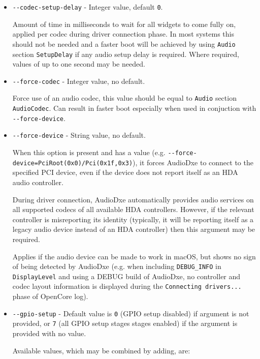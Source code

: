 \documentclass[]{article}
\providecommand{\tightlist}{%
  \setlength{\itemsep}{0pt}\setlength{\parskip}{0pt}}
\begin{document}
\begin{itemize}
  \tightlist
	\item \texttt{-{}-codec-setup-delay} - Integer value, default \texttt{0}. \medskip

  Amount of time in milliseconds to wait for all widgets to come fully on, applied per codec
  during driver connection phase. In most systems this should not be needed and a faster boot
  will be achieved by using \texttt{Audio} section \texttt{SetupDelay} if any audio setup delay
  is required. Where required, values of up to one second may be needed. \medskip

  \item \texttt{-{}-force-codec} - Integer value, no default. \medskip

  Force use of an audio codec, this value should be equal to \texttt{Audio} section \texttt{AudioCodec}.
  Can result in faster boot especially when used in conjuction with \texttt{-{}-force-device}. \medskip

	\item \texttt{-{}-force-device} - String value, no default. \medskip

  When this option is present and has a value (e.g. \texttt{-{}-force-device=PciRoot(0x0)/Pci(0x1f,0x3)}), it
  forces AudioDxe to connect to the specified PCI device, even if the device does not report itself as
  an HDA audio controller.

  During driver connection, AudioDxe automatically provides audio services on all supported codecs of
  all available HDA controllers. However, if the relevant controller is misreporting its identity
  (typically, it will be reporting itself as a legacy audio device instead of an HDA controller)
  then this argument may be required.

  Applies if the audio device can be made to work in macOS, but shows no sign of being detected by AudioDxe
  (e.g. when including \texttt{DEBUG\_INFO} in \texttt{DisplayLevel} and using a DEBUG build of AudioDxe,
  no controller and codec layout information is displayed during the \texttt{Connecting drivers...}
  phase of OpenCore log). \medskip

  \item \texttt{-{}-gpio-setup} - Default value is \texttt{0} (GPIO setup disabled) if argument is not provided,
  or \texttt{7} (all GPIO setup stages stages enabled) if the argument is provided with no value. \medskip

	Available values, which may be combined by adding, are: \medskip


\end{itemize}
\end{document}

